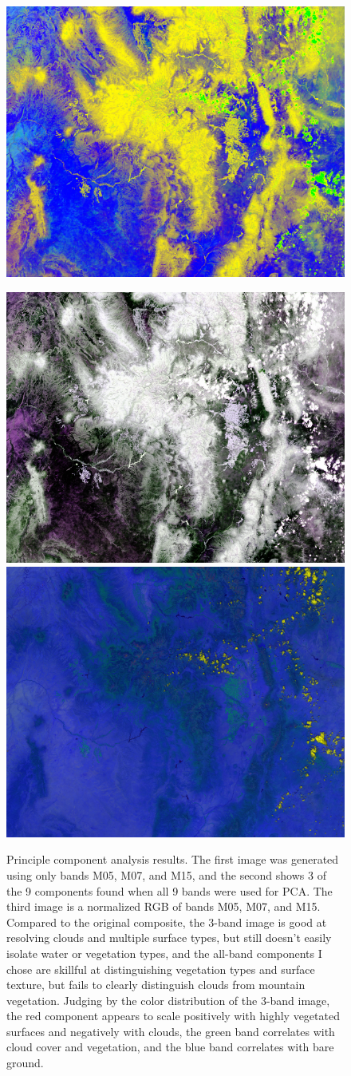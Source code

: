 \documentclass[12pt]{article}
\begin{document}
\begin{figure}[h!]
    \centering
    \includegraphics[width=.6\linewidth]{figures/p7/pca_4+6+8_eq.png}

    \vspace{.2em}
    \includegraphics[width=.4\linewidth]{figures/p7/pca_0+3+5_eq.png}
    \includegraphics[width=.4\linewidth]{figures/p7/region_M05+M07+M15.png}
    \caption{Principle component analysis results. The first image was generated using only bands M05, M07, and M15, and the second shows 3 of the 9 components found when all 9 bands were used for PCA. The third image is a normalized RGB of bands M05, M07, and M15. Compared to the original composite, the 3-band image is good at resolving clouds and multiple surface types, but still doesn't easily isolate water or vegetation types, and the all-band components I chose are skillful at distinguishing vegetation types and surface texture, but fails to clearly distinguish clouds from mountain vegetation. Judging by the color distribution of the 3-band image, the red component appears to scale positively with highly vegetated surfaces and negatively with clouds, the green band correlates with cloud cover and vegetation, and the blue band correlates with bare ground.}
    \label{p7_results}
\end{figure}
\end{document}
